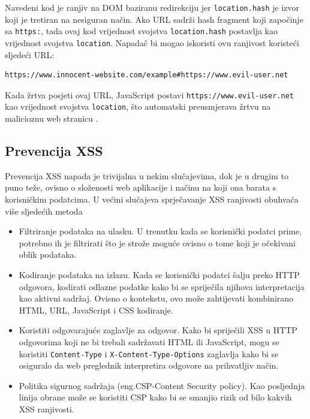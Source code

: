 \documentclass[12pt, oneside, onecolumn]{book}
\begin{document}
{Navedeni kod je ranjiv na DOM baziranu redirekciju jer \texttt{location.hash} je izvor koji je tretiran na nesiguran način. Ako URL sadrži hash fragment koji započinje sa \texttt{https:}, tada ovaj kod vrijednost svojstva \texttt{location.hash} postavlja kao vrijednost svojstva \texttt{location}. Napadač bi mogao iskoristi ovu ranjivost koristeći sljedeći URL:

\begin{verbatim}
https://www.innocent-website.com/example#https://www.evil-user.net
\end{verbatim}

Kada žrtva posjeti ovaj URL, JavaScript postavi \texttt{https://www.evil-user.net} kao vrijednost svojstva \texttt{location}, što automatski preusmjerava žrtvu na malicioznu web stranicu \cite{xssdom}.

\subsection{Prevencija XSS}
Prevencija XSS napada je trivijalna u nekim slučajevima, dok je u drugim to puno teže, ovisno o složenosti web aplikacije i načinu na koji ona barata s korisničkim podatcima. U većini slučajeva sprječavanje XSS ranjivosti obuhvaća više sljedećih metoda \cite{xssport}

\begin{itemize}
\item Filtriranje podataka na ulasku. U trenutku kada se korisnički podatci prime, potrebno ih je filtrirati što je strože moguće ovisno o tome koji je očekivani oblik podataka.
\item Kodiranje podataka na izlazu. Kada se korisnički podatci šalju preko HTTP odgovora, kodirati odlazne podatke kako bi se spriječila njihova interpretacija kao aktivni sadržaj. Ovisno o kontekstu, ovo može zahtijevati kombinirano HTML, URL, JavaScript i CSS kodiranje.
\item Koristiti odgovarajuće zaglavlje za odgovor. Kako bi spriječili XSS u HTTP odgovorima koji ne bi trebali sadržavati HTML ili JavaScript, mogu se koristiti \texttt{Content-Type} i \texttt{X-Content-Type-Options} zaglavlja kako bi se osiguralo da web preglednik interpretira odgovore na prihvatljiv način.
\item Politika sigurnog sadržaja (eng.CSP-Content Security policy). Kao posljednja linija obrane može se koristiti CSP kako bi se smanjio rizik od bilo kakvih XSS ranjivosti.
\end{itemize}

}
\end{document}

